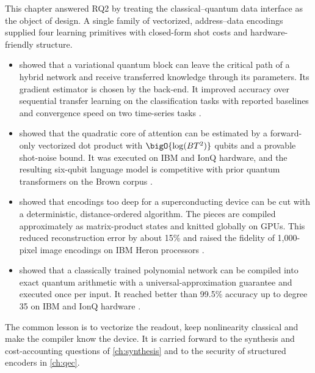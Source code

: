 This chapter answered RQ2 by treating the classical--quantum data interface as the object of design. A single family of vectorized, address--data encodings supplied four learning primitives with closed-form shot costs and hardware-friendly structure.
\begin{itemize}
\item \qpie{} showed that a variational quantum block can leave the critical path of a hybrid network and receive transferred knowledge through its parameters. Its gradient estimator is chosen by the back-end. It improved accuracy over sequential transfer learning on the classification tasks with reported baselines and convergence speed on two time-series tasks \cite{guo2025qpie}.
\item \vqt{} showed that the quadratic core of attention can be estimated by a forward-only vectorized dot product with $\bigO{\log(BT^2)}$ qubits and a provable shot-noise bound. It was executed on IBM and IonQ hardware, and the resulting six-qubit language model is competitive with prior quantum transformers on the Brown corpus \cite{guo2025vqt}.
\item \shardq{} showed that encodings too deep for a superconducting device can be cut with a deterministic, distance-ordered algorithm. The pieces are compiled approximately as matrix-product states and knitted globally on GPUs. This reduced reconstruction error by about 15\% and raised the fidelity of 1,000-pixel image encodings on IBM Heron processors \cite{guo2025shardq}.
\item \nnqa{} showed that a classically trained polynomial network can be compiled into exact quantum arithmetic with a universal-approximation guarantee and executed once per input. It reached better than 99.5\% accuracy up to degree 35 on IBM and IonQ hardware \cite{guo2026nnqa}.
\end{itemize}
The common lesson is to vectorize the readout, keep nonlinearity classical and make the compiler know the device. It is carried forward to the synthesis and cost-accounting questions of \cref{ch:synthesis} and to the security of structured encoders in \cref{ch:qec}.
